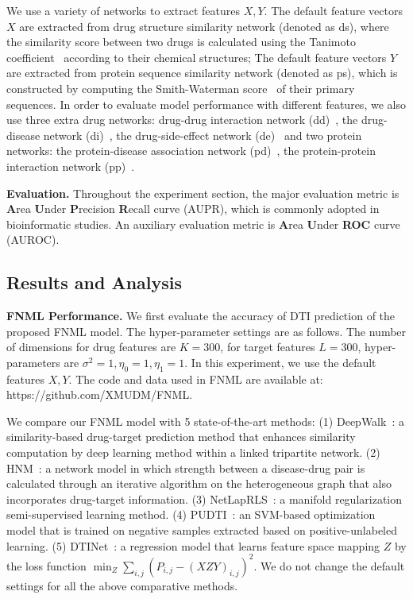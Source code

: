\documentclass[journal]{IEEEtran}
\begin{document}
We use a variety of networks to extract features $X,Y$. The default feature vectors $X$ are extracted from drug structure similarity network (denoted as ds), where the similarity score between two drugs is calculated using the Tanimoto coefficient~\cite{Hattori2003Drug} according to their chemical structures; The default feature vectors $Y$ are extracted from protein sequence similarity network (denoted as ps), which is constructed by computing the Smith-Waterman score~\cite{Smith1981Protein} of their primary sequences. In order to evaluate model performance with different features, we also use three extra drug networks: drug-drug interaction network (dd)~\cite{Knox2011DrugBank}, the drug-disease network (di)~\cite{Davis2012DrugDisease}, the drug-side-effect network (de)~\cite{Kuhn2010DrugSideEffect} and two protein networks: the protein-disease association network (pd)~\cite{Davis2012DrugDisease}, the protein-protein interaction network (pp)~\cite{Keshava2009ProteinInteration}. 



\textbf{Evaluation.} Throughout the experiment section, the major evaluation metric is \textbf{A}rea \textbf{U}nder \textbf{P}recision \textbf{R}ecall curve (AUPR), which is commonly adopted in bioinformatic studies. An auxiliary evaluation metric is \textbf{A}rea \textbf{U}nder \textbf{ROC} curve (AUROC).

\subsection{Results and Analysis}
\textbf{FNML Performance.} We first evaluate the accuracy of DTI prediction of the proposed FNML model. The hyper-parameter settings are as follows. The number of dimensions for drug features are $K=300$, for target features $L=300$, hyper-parameters are $\sigma^2=1,\eta_{0}=1,\eta_{1}=1$. In this experiment, we use the default features $X,Y$. The code and data used in FNML are available at: https://github.com/XMUDM/FNML.



We compare our FNML model with 5 state-of-the-art methods: (1) DeepWalk~\cite{Zong2017Deep}: a similarity-based drug-target prediction method that enhances similarity computation by deep learning method within a linked tripartite network. (2) HNM~\cite{Wang2014Drug}: a network model in which strength between a disease-drug pair is calculated through an iterative algorithm on the heterogeneous graph that also incorporates drug-target information. (3) NetLapRLS~\cite{Xia2010Semi}: a manifold regularization semi-supervised learning method. (4) PUDTI~\cite{Peng2017Screening}: an SVM-based optimization model that is trained on negative samples extracted based on positive-unlabeled learning. (5) DTINet~\cite{Luo2017Network}: a regression model that learns feature space mapping $Z$ by the loss function  $\min_{Z} \sum_{i,j}(P_{i,j}-(XZY)_{i,j})^2$. We do not change the default settings for all the above comparative methods.
\end{document}
